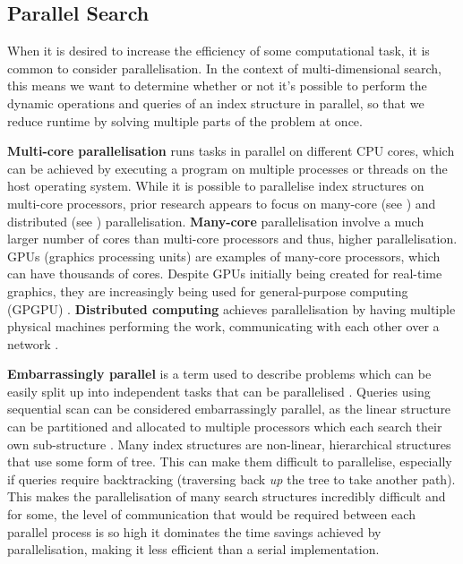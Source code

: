 \subsection{Parallel Search}

When it is desired to increase the efficiency of some computational task, it is common to consider parallelisation. In the context of multi-dimensional search, this means we want to determine whether or not it's possible to perform the dynamic operations and queries of an index structure in parallel, so that we reduce runtime by solving multiple parts of the problem at once.

\textbf{Multi-core parallelisation} runs tasks in parallel on different CPU cores, which can be achieved by executing a program on multiple processes or threads on the host operating system. While it is possible to parallelise index structures on multi-core processors, prior research appears to focus on many-core (see  \cite{btree-gpu1, btree-gpu2, btree-gpu3, traversing-spatial-indexes-gpu, rtree-gpu1, rtree-gpu2}) and distributed (see \cite{fat-btree, distributed-kd-tree, distributed-md-search}) parallelisation. \textbf{Many-core} parallelisation involve a much larger number of cores than multi-core processors and thus, higher parallelisation. GPUs (graphics processing units) are examples of many-core processors, which can have thousands of cores. Despite GPUs initially being created for real-time graphics, they are increasingly being used for general-purpose computing (GPGPU) \cite{performance-tuning-gpgpu}. \textbf{Distributed computing} achieves parallelisation by having multiple physical machines performing the work, communicating with each other over a network \cite{distributed-systems}.

\textbf{Embarrassingly parallel} is a term used to describe problems which can be easily split up into independent tasks that can be parallelised \cite{designing-parallel-programs}. Queries using sequential scan can be considered embarrassingly parallel, as the linear structure can be partitioned and allocated to multiple processors which each search their own sub-structure \cite{gpu-gems-3}. Many index structures are non-linear, hierarchical structures that use some form of tree. This can make them difficult to parallelise, especially if queries require backtracking (traversing back \textit{up} the tree to take another path). This makes the parallelisation of many search structures incredibly difficult and for some, the level of communication that would be required between each parallel process is so high it dominates the time savings achieved by parallelisation, making it less efficient than a serial implementation.


